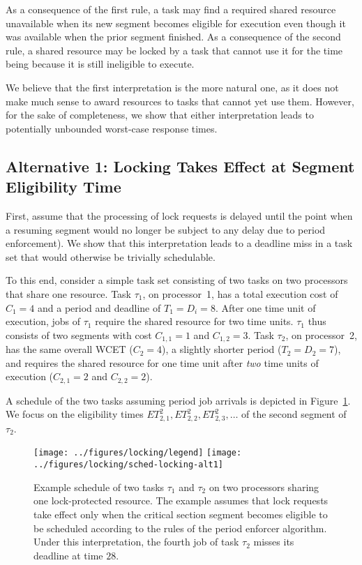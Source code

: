 As a consequence of the first rule, a task may find a required shared resource unavailable when its new segment becomes eligible for execution even though it was available when the prior segment finished.  As a consequence of the second rule, a shared resource may be locked by a task that cannot use it for the time being because it is still ineligible to execute.

We believe that the first interpretation is the more natural one, as it does not make much sense to award resources to tasks that cannot yet use them. However, for the sake of completeness, we show that either interpretation leads to potentially unbounded worst-case response times.

\subsection{Alternative 1: Locking Takes Effect at Segment Eligibility Time}
First, assume that the processing of lock requests is delayed until the point when a resuming segment would no longer be subject to any delay due to period enforcement). We show that this interpretation leads to a deadline miss in a task set that would otherwise be trivially schedulable.

To this end, consider a simple task set consisting of two tasks on two processors that share one resource. Task $\tau_1$, on processor~1, has a total execution cost of $C_1 = 4$ and a period and deadline of $T_1 = D_i = 8$. After one time unit of execution, jobs of $\tau_1$ require the shared resource for two time units. $\tau_1$ thus consists of two segments with cost $C_{1,1} = 1$ and $C_{1,2} = 3$. Task $\tau_2$, on processor~2, has the same overall WCET ($C_2 = 4$), a slightly shorter period ($T_2 = D_2 = 7$), and requires the shared resource for one time unit after \emph{two} time units of execution ($C_{2,1} = 2$ and $C_{2,2} = 2$).

A schedule of the two tasks assuming period job arrivals is depicted in Figure~\ref{fig:locking-alt1}. We focus on the eligibility times $ET_{2,1}^2,ET_{2,2}^2,ET_{2,3}^2,\ldots$ of the second segment of $\tau_2$.

\begin{figure}[t]
  \centering
  \texttt{[image: ../figures/locking/legend]}
  \texttt{[image: ../figures/locking/sched-locking-alt1]}
  \caption{Example schedule of two tasks $\tau_1$ and $\tau_2$ on two processors sharing one lock-protected resource. The example assumes that lock requests take effect only when the critical section segment  becomes eligible to be scheduled according to the rules of the period enforcer algorithm. Under this interpretation, the fourth job of task $\tau_2$ misses its deadline at time $28$.}
  \label{fig:locking-alt1}
  \end{figure}



